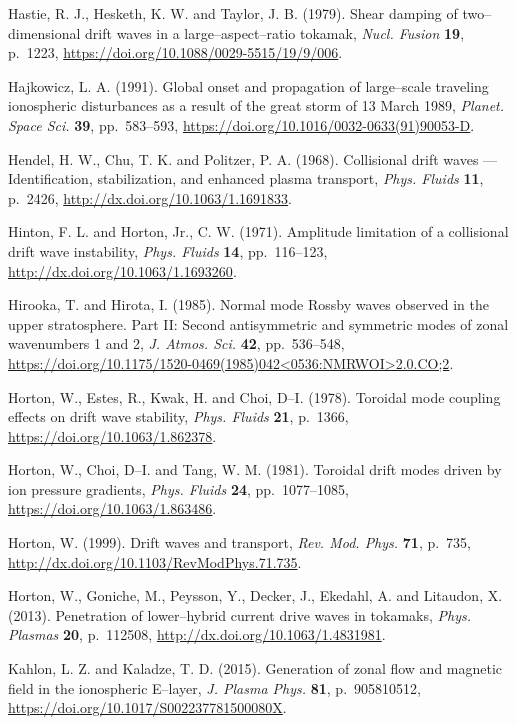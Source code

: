 \documentclass[a4paper,openany,12pt]{book}
\begin{document}
\begin{thebibliography}{100}
\bibitem{}
Hastie, R. J., Hesketh, K. W. and Taylor, J. B. (1979). Shear damping of two--dimensional drift waves in a large--aspect--ratio tokamak, \emph{Nucl. Fusion} \textbf{19}, p.~1223, \url{https://doi.org/10.1088/0029-5515/19/9/006}.

\bibitem{}
Hajkowicz, L. A. (1991). Global onset and propagation of large--scale traveling ionospheric disturbances as a result of the great storm of 13 March 1989, \emph{Planet. Space Sci.} \textbf{39}, pp.~583--593, \url{https://doi.org/10.1016/0032-0633(91)90053-D}.

\bibitem{}
Hendel, H. W., Chu, T. K. and Politzer, P. A. (1968). Collisional drift waves --- Identification, stabilization, and enhanced plasma transport, \emph{Phys. Fluids} \textbf{11}, p.~2426, \url{http://dx.doi.org/10.1063/1.1691833}.

\bibitem{}
Hinton, F. L. and Horton, Jr., C. W. (1971). Amplitude limitation of a collisional drift wave instability, \emph{Phys. Fluids} \textbf{14}, pp.~116--123, \url{http://dx.doi.org/10.1063/1.1693260}.

\bibitem{}
Hirooka, T. and Hirota, I. (1985). Normal mode Rossby waves observed in the upper stratosphere. Part II: Second antisymmetric and symmetric modes of zonal wavenumbers 1 and 2, {\it J. Atmos. Sci.} \textbf{42}, 
pp.~536--548, \url{https://doi.org/10.1175/1520-0469(1985)042<0536:NMRWOI>2.0.CO;2}.

\bibitem{}
Horton, W., Estes, R., Kwak, H. and Choi, D--I. (1978). Toroidal mode coupling effects on drift wave stability, \emph{Phys. Fluids} \textbf{21}, p.~1366, \url{https://doi.org/10.1063/1.862378}.

\bibitem{}
Horton, W., Choi, D--I. and Tang, W. M. (1981). Toroidal drift modes driven by ion pressure gradients, \emph{Phys. Fluids} \textbf{24}, pp.~1077--1085, \url{https://doi.org/10.1063/1.863486}.

\bibitem{}
Horton, W. (1999). Drift waves and transport, \emph{Rev. Mod. Phys.} \textbf{71}, p.~735, \url{http://dx.doi.org/10.1103/RevModPhys.71.735}.

\bibitem{}
Horton, W., Goniche, M., Peysson, Y., Decker, J., Ekedahl, A. and Litaudon, X. (2013). Penetration of lower--hybrid current drive waves in tokamaks, \emph{Phys. Plasmas} \textbf{20}, p.~112508, \url{http://dx.doi.org/10.1063/1.4831981}.

\bibitem{}
Kahlon, L. Z. and Kaladze, T. D. (2015). Generation of zonal flow and magnetic field in the ionospheric E--layer, \emph{J. Plasma Phys.} \textbf{81}, p.~905810512, \url{https://doi.org/10.1017/S002237781500080X}.


\end{thebibliography}
\end{document}
